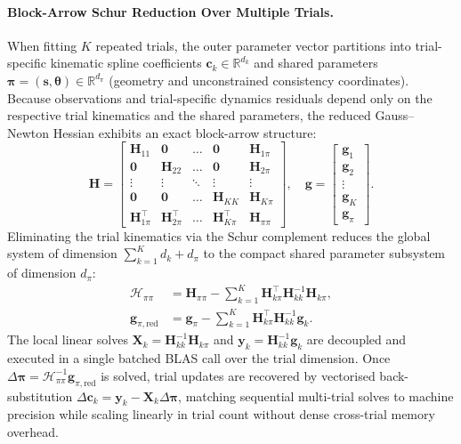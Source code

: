 \documentclass[11pt,a4paper]{article}
\newcommand{\R}{\mathbb{R}}
\begin{document}
\paragraph{Block-Arrow Schur Reduction Over Multiple Trials.}
When fitting $K$ repeated trials, the outer parameter vector partitions into trial-specific kinematic spline coefficients $\mathbf{c}_k \in \R^{d_k}$ and shared parameters $\boldsymbol{\pi} = (\mathbf{s}, \boldsymbol{\theta}) \in \R^{d_\pi}$ (geometry and unconstrained consistency coordinates). Because observations and trial-specific dynamics residuals depend only on the respective trial kinematics and the shared parameters, the reduced Gauss--Newton Hessian exhibits an exact block-arrow structure:
\begin{equation}
  \mathbf{H} = \begin{bmatrix}
    \mathbf{H}_{11} & \mathbf{0} & \dots & \mathbf{0} & \mathbf{H}_{1\pi} \\
    \mathbf{0} & \mathbf{H}_{22} & \dots & \mathbf{0} & \mathbf{H}_{2\pi} \\
    \vdots & \vdots & \ddots & \vdots & \vdots \\
    \mathbf{0} & \mathbf{0} & \dots & \mathbf{H}_{KK} & \mathbf{H}_{K\pi} \\
    \mathbf{H}_{1\pi}^\top & \mathbf{H}_{2\pi}^\top & \dots & \mathbf{H}_{K\pi}^\top & \mathbf{H}_{\pi\pi}
  \end{bmatrix}, \quad
  \mathbf{g} = \begin{bmatrix}
    \mathbf{g}_1 \\ \mathbf{g}_2 \\ \vdots \\ \mathbf{g}_K \\ \mathbf{g}_\pi
  \end{bmatrix}.
  \label{eq:block_arrow_hessian}
\end{equation}
Eliminating the trial kinematics via the Schur complement reduces the global system of dimension $\sum_{k=1}^K d_k + d_\pi$ to the compact shared parameter subsystem of dimension $d_\pi$:
\begin{align}
  \boldsymbol{\mathcal{H}}_{\pi\pi} &= \mathbf{H}_{\pi\pi} - \sum_{k=1}^K \mathbf{H}_{k\pi}^\top \mathbf{H}_{kk}^{-1} \mathbf{H}_{k\pi}, \label{eq:schur_reduced_system} \\
  \mathbf{g}_{\pi,\mathrm{red}} &= \mathbf{g}_\pi - \sum_{k=1}^K \mathbf{H}_{k\pi}^\top \mathbf{H}_{kk}^{-1} \mathbf{g}_k. \nonumber
\end{align}
The local linear solves $\mathbf{X}_k = \mathbf{H}_{kk}^{-1} \mathbf{H}_{k\pi}$ and $\mathbf{y}_k = \mathbf{H}_{kk}^{-1} \mathbf{g}_k$ are decoupled and executed in a single batched BLAS call over the trial dimension. Once $\Delta\boldsymbol{\pi} = \boldsymbol{\mathcal{H}}_{\pi\pi}^{-1} \mathbf{g}_{\pi,\mathrm{red}}$ is solved, trial updates are recovered by vectorised back-substitution $\Delta\mathbf{c}_k = \mathbf{y}_k - \mathbf{X}_k \Delta\boldsymbol{\pi}$, matching sequential multi-trial solves to machine precision while scaling linearly in trial count without dense cross-trial memory overhead.
\end{document}
